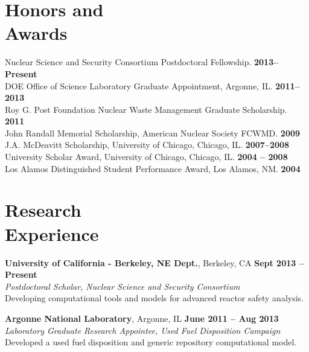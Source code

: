 \documentclass[margin,line]{resume}
\begin{document}
\begin{resume}
    \section{\mysidestyle Honors and\\Awards} 
                Nuclear Science and Security Consortium Postdoctoral Fellowship.   \hfill \textbf{2013--Present}\vspace{.5mm}\\%
		DOE Office of Science Laboratory Graduate Appointment, Argonne, IL.   \hfill \textbf{2011--2013}\vspace{.5mm}\\%
		Roy G. Post Foundation Nuclear Waste Management Graduate Scholarship.       \hfill \textbf{2011}\vspace{.5mm}\\%
		John Randall Memorial Scholarship, American Nuclear Society FCWMD.          \hfill \textbf{2009}\vspace{.5mm}\\%
		J.A. McDeavitt Scholarship, University of Chicago, Chicago, IL.        \hfill\textbf{2007--2008}\vspace{.5mm}\\%
		University Scholar Award, University of Chicago, Chicago, IL.        \hfill\textbf{2004 -- 2008}\vspace{.5mm}\\%
		Los Alamos Distinguished Student Performance Award, Los Alamos, NM.          \hfill\textbf{2004}%
    \section{\mysidestyle Research\\Experience}
    \textbf{University of California - Berkeley, NE Dept.}, Berkeley, CA \hfill \textbf{Sept 2013 -- Present}\\
		\textsl{Postdoctoral Scholar, Nuclear Science and Security Consortium}\\ 
                Developing computational tools and models for advanced reactor safety analysis.

    \textbf{Argonne National Laboratory}, Argonne, IL \hfill \textbf{June 2011 -- Aug 2013}\\
		\textsl{Laboratory Graduate Research Appointee, Used Fuel Disposition Campaign}\\ 
		Developed a used fuel disposition and generic repository computational model.


\end{resume}
\end{document}

